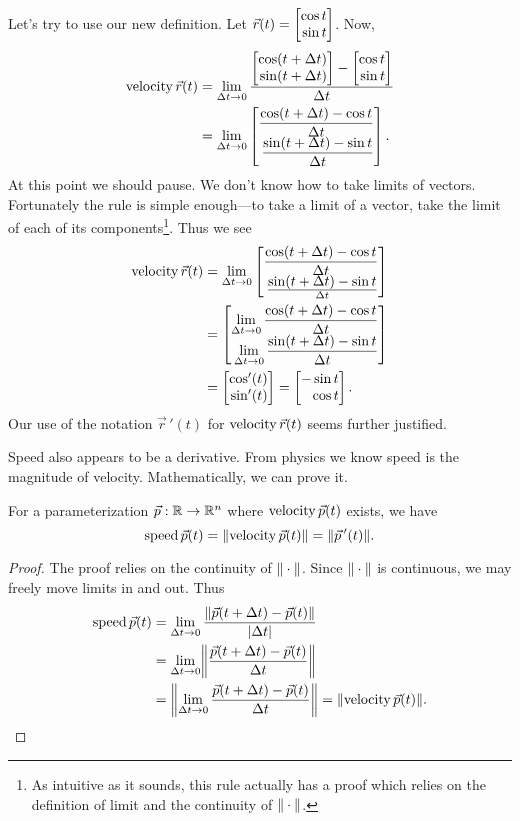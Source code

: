 Let's try to use our new definition.  Let $\vec r(t) = \mat{\cos t\\\sin t}$.  Now,
\begin{align*}
	\Vel \vec r(t) &=\lim_{\Delta t\to 0} \frac{\mat{\cos(t+\Delta t)\\\sin(t+\Delta t)} - \mat{\cos t\\\sin t}}{\Delta t}\\
	&=\lim_{\Delta t\to 0} \mat{
		\displaystyle\frac{\cos(t+\Delta t)-\cos t}{\Delta t} \\\displaystyle\frac{\sin(t+\Delta t)-\sin t}{\Delta t}
		}.
\end{align*}
At this point we should pause.  We don't know how to take limits of vectors.  Fortunately the rule
is simple enough---to take a limit of a vector, take the limit of each of its components\footnote{
	As intuitive as it sounds, this rule actually has a proof which relies on the definition
	of limit and the continuity of $\lVert\:\cdot\:\rVert$.
}.  Thus we see
\begin{align*}
	\Vel \vec r(t) 
	&=\lim_{\Delta t\to 0} \mat{
		\displaystyle\frac{\cos(t+\Delta t)-\cos t}{\Delta t} \\\frac{\displaystyle\sin(t+\Delta t)-\sin t}{\Delta t}}\\
	&=\mat{
		\displaystyle\lim_{\Delta t\to 0} \frac{\cos(t+\Delta t)-\cos t}{\Delta t} \\\displaystyle\lim_{\Delta t\to 0} \frac{\sin(t+\Delta t)-\sin t}{\Delta t}
		}\\
	&=\mat{\cos'(t)\\\sin'(t)} = \mat{-\sin t\\\cos t}.
\end{align*}
Our use of the notation $\vec r\,'(t)$ for $\operatorname{velocity} \vec r(t)$ seems further justified.

Speed also appears to be a derivative.  From physics we know speed is the magnitude of 
velocity.  Mathematically, we can prove it.
\begin{theorem}
	For a parameterization $\vec p:\mathbb{R}\to\mathbb{R}^n$ where $\operatorname{velocity} \vec p(t)$
	exists, we have
	\[
		\operatorname{speed} \vec p(t) = \lVert\operatorname{velocity} \vec p(t)\rVert = \lVert\vec p\,'(t)\rVert.
	\]
\end{theorem}
\begin{proof}
	The proof relies on the continuity of $\lVert\:\cdot\:\rVert$.  Since $\lVert\:\cdot\:\rVert$
	is continuous, we may freely move limits in and out.  Thus
	\begin{align*}
		\Speed \vec p(t) &= \lim_{\Delta t\to 0} \frac{\norm{\vec p(t+\Delta t) - \vec p(t)}}{\abs{\Delta t}}\\
		&= \lim_{\Delta t\to 0} \norm*{\frac{\vec p(t+\Delta t) - \vec p(t)}{\Delta t}}\\
		&=\norm*{\lim_{\Delta t\to 0} \frac{\vec p(t+\Delta t) - \vec p(t)}{\Delta t}}
		=\norm{\Vel \vec p(t)}.
	\end{align*}
\end{proof}

